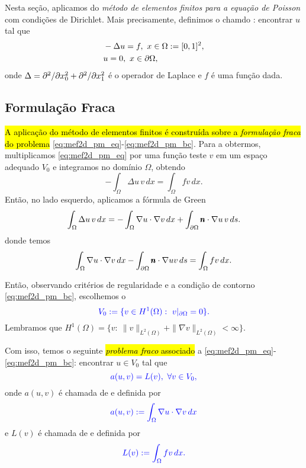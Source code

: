 Nesta seção, aplicamos do \emph{método de elementos finitos para a equação de Poisson}{\poisson} com condições de Dirichlet{\dirichlet}. Mais precisamente, definimos o chamdo : encontrar $u$ tal que
\begin{align}\hleq
  &-\Delta u = f, ~x\in\Omega:=[0,1]^2,\label{eq:mef2d_pm_eq}\\
  &u = 0, ~x\in\p\Omega,\label{eq:mef2d_pm_bc}
\end{align}
onde $\Delta = \partial^2/\partial x_0^2 + \partial^2/\partial x_1^2$ é o operador de Laplace{\laplace} e $f$ é uma função dada.

\subsection{Formulação Fraca}
\badgeRevisar

\hl{A aplicação do método de elementos finitos é construída sobre a \emph{formulação fraca} do problema} \eqref{eq:mef2d_pm_eq}-\eqref{eq:mef2d_pm_bc}. Para a obtermos, multiplicamos \eqref{eq:mef2d_pm_eq} por uma função teste $v$ em um espaço adequado $V_0$ e integramos no domínio $\Omega$, obtendo
\begin{equation}
  - \int_\Omega \Delta u\,v\,dx = \int_\Omega fv\,dx.
\end{equation}
Então, no lado esquerdo, aplicamos a fórmula de Green{\green}
\begin{equation}
  \int_\Omega \Delta u\,v\,dx = -\int_\Omega \nabla u\cdot\nabla v\,dx + \int_{\partial\Omega} \pmb{n}\cdot\nabla u\,v\,ds.
\end{equation}
donde temos
\begin{equation}
  \int_\Omega \nabla u\cdot\nabla v\,dx - \int_{\partial\Omega} \pmb{n}\cdot\nabla uv\,ds = \int_\Omega fv\,dx.
\end{equation}

Então, observando critérios de regularidade e a condição de contorno \eqref{eq:mef2d_pm_bc}, escolhemos o 
\begin{equation}\color{blue}V_0 := \{v\in H^1(\Omega): ~v|_{\partial\Omega}=0\}.
\end{equation}
Lembramos que $H^1(\Omega) = \{v:~\|v\|_{L^2(\Omega)}+\|\nabla v\|_{L^2(\Omega)}<\infty\}$.

Com isso, temos o seguinte \hl{\emph{problema fraco} associado} a \eqref{eq:mef2d_pm_eq}-\eqref{eq:mef2d_pm_bc}: encontrar $u\in V_0$ tal que
\begin{equation}\label{eq:mef2d_probfraco}\color{blue}a(u,v) = L(v),~\forall v\in V_0,
\end{equation}
onde $a(u, v)$ é chamada de  e definida por
\begin{equation}\color{blue}a(u,v) := \int_\Omega \nabla u\cdot\nabla v\,dx
\end{equation}
e $L(v)$ é chamada de  e definida por
\begin{equation}\color{blue}L(v) := \int_\Omega fv\,dx.
\end{equation}

